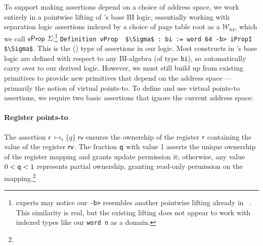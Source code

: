 To support making assertions depend on a choice of address space, we work entirely in a pointwise lifting of \iris's base BI logic,
essentially working with separation logic assertions indexed by a choice of page table root as a $\mathcal{W}_{64}$, which we call $\textsf{vProp }\Sigma$:\footnote{
  \iris experts may notice our \lstinline|-b>| resembles another pointwise lifting already in  \iris~\cite{dang2019rustbelt,dang2022compass}. 
  This similarity is real, but the existing lifting does not appear to work with indexed \coq types like our \lstinline|word n| as a domain.
}
\lstinline[language=Coq]|Definition vProp  $\Sigma$ : bi := word 64 -b> iPropI  $\Sigma$|.
This is the (\rocq) type of assertions in our logic.
Most constructs in \iris's base logic are defined with respect to any BI-algebra (of \coq type \lstinline|bi|), so  automatically
carry over to our derived logic.
However, we must still build up from existing \iris primitives to provide new primitives that depend on the address space --- primarily the notion
of virtual points-to.
To define and use virtual points-to assertions, we require two basic assertions that ignore
the current address space:

\paragraph{Register points-to} 
The assertion $\textsf{r}\;\mapsto_{\textsf{r}}\{q\}\;\textsf{rv}$ ensures the ownership of the register $\mathsf{r}$ containing the
value of the register $\mathsf{rv}$.
The fraction $\mathsf{q}$ with value 1 asserts the unique ownership of the register mapping and grants update permission  it;
otherwise, any value $0 < \mathsf{q} <1$ represents partial ownership, granting read-only permission on the mapping.\footnote{
}

